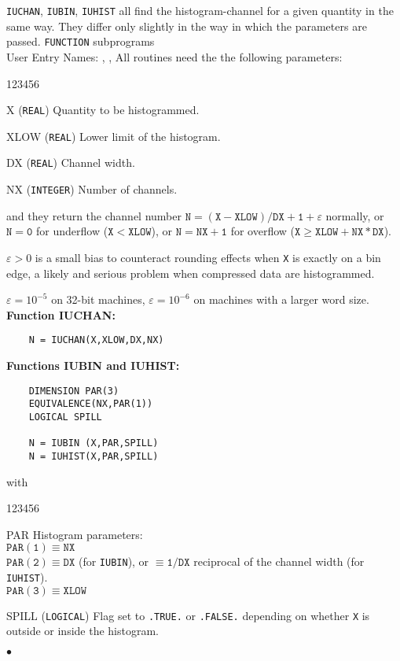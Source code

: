                      
                      
               
       
{\tt IUCHAN}, {\tt IUBIN}, {\tt IUHIST} all find the histogram-channel
for a given quantity in the same way.
They differ only slightly in the way in which the parameters are passed.
\Structure
{\tt FUNCTION} subprograms   \\
User Entry Names: , , 
\Usage
All routines need the the following parameters:
\begin{DLtt}{123456}
\item [X] ({\tt REAL}) Quantity to be histogrammed.
\item [XLOW] ({\tt REAL}) Lower limit of the histogram.
\item [DX] ({\tt REAL}) Channel width.
\item [NX] ({\tt INTEGER}) Number of channels.
\end{DLtt}
and they return the channel number
$\mathtt{N=(X-XLOW)/DX+1+\varepsilon}$ normally,
or $\mathtt{N=0}$ for underflow ($\mathtt{X<XLOW}$),
or $\mathtt{N=NX+1}$  for overflow ($\mathtt{X \geq XLOW + NX*DX}$).
\par
$\varepsilon > 0$ is a small bias to counteract rounding effects when
{\tt X} is exactly on a bin edge, a likely and serious problem when
compressed data are histogrammed.
\par
$\varepsilon = 10^{-5}$ on 32-bit machines,
$\varepsilon = 10^{-6}$ on machines with a larger word size. \\[3mm]
{\bf Function IUCHAN:}
\begin{verbatim}
    N = IUCHAN(X,XLOW,DX,NX)
\end{verbatim}
\par
{\bf Functions IUBIN and IUHIST:}
\begin{verbatim}
    DIMENSION PAR(3)
    EQUIVALENCE(NX,PAR(1))
    LOGICAL SPILL
 
    N = IUBIN (X,PAR,SPILL)
    N = IUHIST(X,PAR,SPILL)
\end{verbatim}
with
\begin{DLtt}{123456}
\item [PAR] Histogram parameters: \\
$\mathtt{PAR(1) \equiv NX}$  \\
$\mathtt{PAR(2) \equiv DX}$ (for {\tt IUBIN}),
or $\mathtt{\equiv 1/DX}$ reciprocal of the channel width (for
{\tt IUHIST}). \\
$\mathtt{PAR(3) \equiv XLOW}$
\item [SPILL] ({\tt LOGICAL}) Flag set to {\tt .TRUE.} or {\tt .FALSE.}
depending on whether {\tt X} is outside
or inside the histogram.
\end{DLtt}
$\bullet$
